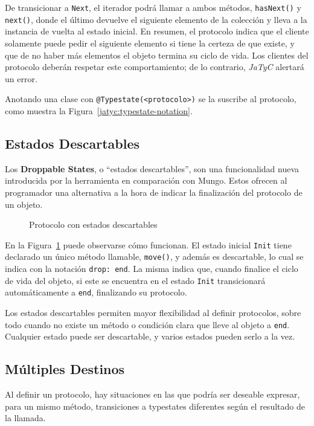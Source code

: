 De transicionar a \texttt{Next}, el iterador podrá llamar a ambos métodos, \texttt{hasNext()} y \texttt{next()}, donde el último devuelve el siguiente elemento de la colección y lleva a la instancia de vuelta al estado inicial. En resumen, el protocolo indica que el cliente solamente puede pedir el siguiente elemento si tiene la certeza de que existe, y que de no haber más elementos el objeto termina su ciclo de vida. Los clientes del protocolo deberán respetar este comportamiento; de lo contrario, \textit{JaTyC} alertará un error.

Anotando una clase con \texttt{@Typestate(<protocolo>)} se la suscribe al protocolo, como muestra la Figura~\ref{jatyc:typestate-notation}.

\subsection{Estados Descartables}

Los \textbf{Droppable States}, o ``estados descartables'', son una funcionalidad nueva introducida por la herramienta en comparación con Mungo. Estos ofrecen al programador una alternativa a la hora de indicar la finalización del protocolo de un objeto.

\begin{figure}[htbp]
    \centering
    
    \caption{Protocolo con estados descartables}
    \label{jatyc:droppable}
\end{figure}

En la Figura~\ref{jatyc:droppable} puede observarse cómo funcionan. El estado inicial \texttt{Init} tiene declarado un único método llamable, \texttt{move()}, y además es descartable, lo cual se indica con la notación \texttt{drop: end}. La misma indica que, cuando finalice el ciclo de vida del objeto, si este se encuentra en el estado \texttt{Init} transicionará automáticamente a \texttt{end}, finalizando su protocolo.

Los estados descartables permiten mayor flexibilidad al definir protocolos, sobre todo cuando no existe un método o condición clara que lleve al objeto a \texttt{end}. Cualquier estado puede ser descartable, y varios estados pueden serlo a la vez.

\subsection{Múltiples Destinos}

Al definir un protocolo, hay situaciones en las que podría ser deseable expresar, para un mismo método, transiciones a typestates diferentes según el resultado de la llamada.


